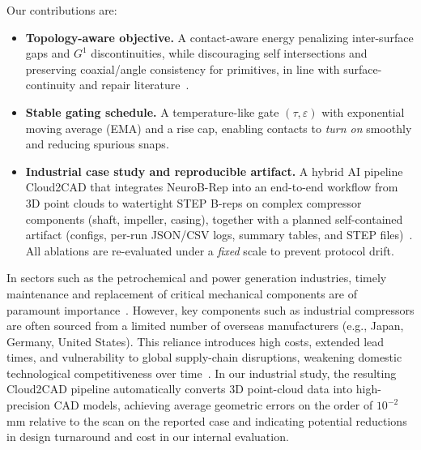 \documentclass{ieeeaccess}
\begin{document}
Our contributions are:
\begin{itemize}
  \item \textbf{Topology-aware objective.} A contact-aware energy penalizing inter-surface gaps and $G^1$ discontinuities, while discouraging self intersections and preserving coaxial/angle consistency for primitives, in line with surface-continuity and repair literature~\cite{b10,b11,b12,b22}.
  \item \textbf{Stable gating schedule.} A temperature-like gate $(\tau,\varepsilon)$ with exponential moving average (EMA) and a rise cap, enabling contacts to \emph{turn on} smoothly and reducing spurious snaps.
  \item \textbf{Industrial case study and reproducible artifact.} A hybrid AI pipeline Cloud2CAD that integrates NeuroB-Rep into an end-to-end workflow from 3D point clouds to watertight STEP B-reps on complex compressor components (shaft, impeller, casing), together with a planned self-contained artifact (configs, per-run JSON/CSV logs, summary tables, and STEP files)~\cite{b2}. All ablations are re-evaluated under a \emph{fixed} scale to prevent protocol drift.
\end{itemize}

In sectors such as the petrochemical and power generation industries, timely maintenance and replacement of critical mechanical components are of paramount importance~\cite{b16,b25}. However, key components such as industrial compressors are often sourced from a limited number of overseas manufacturers (e.g., Japan, Germany, United States). This reliance introduces high costs, extended lead times, and vulnerability to global supply-chain disruptions, weakening domestic technological competitiveness over time~\cite{b16}. In our industrial study, the resulting Cloud2CAD pipeline automatically converts 3D point-cloud data into high-precision CAD models, achieving average geometric errors on the order of $10^{-2}$\,mm relative to the scan on the reported case and indicating potential reductions in design turnaround and cost in our internal evaluation.
\end{document}
